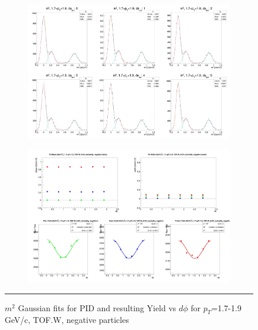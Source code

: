 \begin{figure}[H]
  \centering
    \begin{subfigure}[p]{1\textwidth}
    \includegraphics[width=1\textwidth]{lowptfits/yieldvsdphi_tof1_cent0_ch0_pT-17-19.jpg}
    \end{subfigure}
    \begin{subfigure}[p]{1\textwidth}
    \includegraphics[width=1\textwidth]{lowptfits/fitParams_tof1_cent0_ch0_pT-17-19.jpg}
    \end{subfigure}
    \rule{35em}{0.5pt}
  \caption[PID fits and Yield vs $d\phi$ for $p_T$=1.7-1.9 GeV/c, TOF.W, negative particles ]{$m^2$ Gaussian fits for PID and resulting Yield vs $d\phi$ for $p_T$=1.7-1.9 GeV/c, TOF.W, negative particles}
  \label{fig:fits17-19neg}
\end{figure}

